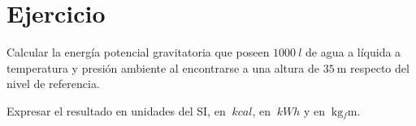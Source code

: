 \section{Ejercicio}\label{ej:Chap01Ejercicio04}
Calcular la energía potencial gravitatoria que poseen $\SI{1000}{l}$ de agua a líquida a temperatura y presión ambiente al encontrarse a una altura de $\SI{35}{\meter}$ respecto del nivel de referencia.

Expresar el resultado en unidades del SI, en $\SI{}{kcal}$, en $\SI{}{kWh}$ y en $\SI{}{\kilogram_f\meter}$.